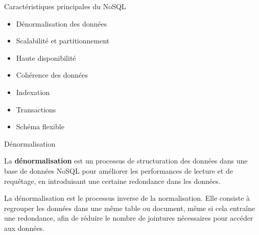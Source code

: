 \begin{frame}{Caractéristiques principales du NoSQL}

    \begin{itemize}
        \item Dénormalisation des données
        \item Scalabilité et partitionnement
        \item Haute disponibilité
        \item Cohérence des données
        \item Indexation
        \item Transactions
        \item Schéma flexible
    \end{itemize}
\end{frame}

\begin{frame}{Dénormalisation}

	\begin{definitionbox}
		La \textbf{dénormalisation} est un processus de structuration des données dans une base de données NoSQL pour améliorer les performances de lecture et de requêtage, en introduisant une certaine redondance dans les données.
	\end{definitionbox}

	La dénormalisation est le processus inverse de la normalisation. Elle consiste à regrouper les données dans une même table ou document, même si cela entraîne une redondance, afin de réduire le nombre de jointures nécessaires pour accéder aux données.

\end{frame}
